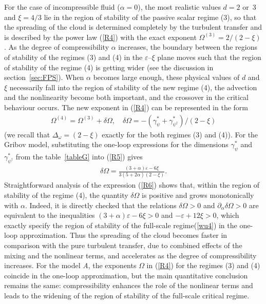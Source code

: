 \documentclass[12pt]{iopart}
\begin{document}
For the case of incompressible fluid ($\alpha=0$), the most realistic values
$d=2$ or~3 and $\xi=4/3$ lie in the region of stability of the passive scalar
regime (3), so that the spreading of the cloud is determined completely
by the turbulent transfer and is described by the power law (\ref{R4})
with the exact exponent $\Omega^{(3)}= 2/(2-\xi)$. As the degree of
compressibility $\alpha$ increases, the boundary between the regions of
stability of the regimes (3) and (4) in the $\varepsilon$--$\xi$ plane
moves such that the region of
stability of the regime (4) is getting wider (see the discussion in
section~\ref{sec:FPS}). When $\alpha$ becomes large enough, these physical
values of $d$ and $\xi$ necessarily fall into the region of stability of the
new regime (4), the advection and the nonlinearity become both important,
and the crossover in the critical behaviour occurs. The new exponent in
(\ref{R4}) can be represented in the form
\begin{eqnarray}
\Omega^{(4)}= \Omega^{(3)} + \delta\Omega, \quad
\delta\Omega = - (\gamma_{\psi}^{*}+\gamma_{\psi^{\dag}}^{*}) / (2-\xi)
\label{R5}
\end{eqnarray}
(we recall that $\Delta_{\omega}=(2-\xi)$ exactly for the both regimes
(3) and (4)). For the Gribov model, substituting the one-loop expressions
for the dimensions $\gamma_{\psi}^{*}$ and $\gamma_{\psi^{\dag}}^{*}$
from the table~\ref{tableG} into (\ref{R5}) gives
\begin{eqnarray}
\delta\Omega = \frac{(3+\alpha)\varepsilon-6\xi}{3(5+2\alpha)(2-\xi)}.
\label{R6}
\end{eqnarray}
Straightforward analysis of the expression (\ref{R6}) shows that, within
the region of stability of the regime (4), the quantity $\delta\Omega$ is
positive and grows monotonically with $\alpha$. 
Indeed, it is directly checked that the relations $\delta\Omega>0$
and $\partial_{\alpha}\delta\Omega>0$ are equivalent to the inequalities
$(3+\alpha)\varepsilon-6\xi>0$ and $-\varepsilon+12\xi>0$, which exactly 
specify the region of stability of the full-scale regime(\ref{wu4})
in the one-loop approximation. Thus the spreading of
the cloud becomes faster in comparison with the pure turbulent transfer,
due to combined effects of the mixing and the nonlinear terms, and
accelerates as the degree of compressibility increases. For the model
{\it A}, the exponents $\Omega$ in (\ref{R4}) for the regimes (3) and (4)
coincide in the one-loop approximation, but the main quantitative
conclusion remains the same: compressibility enhances the role of the
nonlinear terms and leads to the widening of the region of stability of
the full-scale critical regime.
\end{document}
